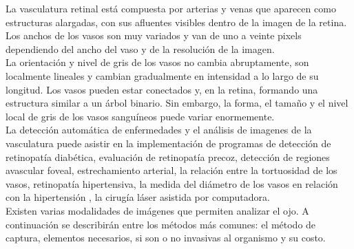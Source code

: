 La vasculatura retinal está compuesta por arterias y venas que aparecen como estructuras alargadas, con sus afluentes visibles dentro de la imagen de la retina.
Los anchos de los vasos son muy variados y van de uno a veinte pixels dependiendo del ancho del vaso y de la resolución de la imagen.
\\
La orientación y nivel de gris de los vasos no cambia abruptamente, son localmente lineales y cambian gradualmente en intensidad a lo largo de su longitud. Los vasos pueden estar conectados y, en la retina, formando una estructura similar a un árbol binario. Sin embargo, la forma, el tamaño y el nivel local de gris de los vasos sanguíneos puede variar enormemente.
\\
La detección automática de enfermedades y el análisis de imagenes de la vasculatura   puede asistir en la implementación de programas de detección de retinopatía diabética, evaluación de retinopatía precoz, detección de regiones avascular foveal, estrechamiento arterial, la relación entre la tortuosidad de los vasos, retinopatía hipertensiva, la medida del diámetro de los vasos en relación con la hipertensión , la cirugía láser asistida por computadora.\cite{fraz2012blood}\\


Existen varias modalidades de imágenes que permiten analizar el ojo. A continuación se describirán entre los métodos más comunes: el método de captura, elementos necesarios, si son o no invasivas al organismo y su costo.

